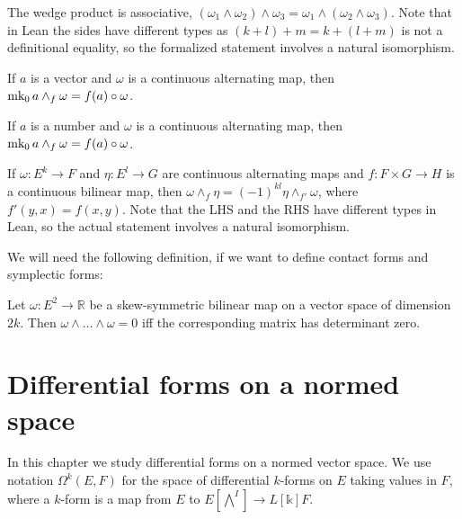 \begin{theorem}
  The wedge product is associative, \((\omega_{1}\wedge \omega_{2})\wedge \omega_{3} = \omega_{1}\wedge (\omega_{2}\wedge \omega_{3})\).
  Note that in Lean the sides have different types as \((k + l) + m = k + (l + m)\) is not a definitional equality,
  so the formalized statement involves a natural isomorphism.
\end{theorem}

\begin{theorem}
  If \(a\) is a vector and \(\omega\) is a continuous alternating map,
  then \(\operatorname{mk_0} a \wedge_{f} \omega = f(a) \circ \omega\).
\end{theorem}

\begin{theorem}
  If \(a\) is a number and \(\omega\) is a continuous alternating map,
  then \(\operatorname{mk_0} a \wedge_{f} \omega = f(a) \circ \omega\).
\end{theorem}

\begin{theorem}
  If \(\omega\colon E^{k}\to F\) and \(\eta\colon E^{l}\to G\) are continuous alternating maps
  and \(f \colon F \times G \to H\) is a continuous bilinear map,
  then \(\omega \wedge_{f} \eta = {(-1)}^{kl}\eta \wedge_{f'} \omega\),
  where \(f'(y, x) = f(x, y)\).
  Note that the LHS and the RHS have different types in Lean,
  so the actual statement involves a natural isomorphism.
\end{theorem}

We will need the following definition, if we want to define contact forms and symplectic forms:

\begin{theorem}
  Let \(\omega\colon E^{2}\to \mathbb R\) be a skew-symmetric bilinear map on a vector space of dimension \(2k\).
  Then \(\omega\wedge\dots\wedge\omega = 0\) iff the corresponding matrix has determinant zero.
\end{theorem}

\chapter{Differential forms on a normed space}%
\label{cha:differential-forms-normed-space}

In this chapter we study differential forms on a normed vector space.
We use notation \(\Omega^{k}(E, F)\) for the space of differential \(k\)-forms on \(E\) taking values in \(F\),
where a \(k\)-form is a map from \(E\) to \(E [\bigwedge^{I}]\to L[\mathbb k] F\).

